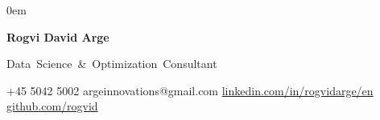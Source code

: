 \documentclass[11pt,a4paper]{article}
\begin{document}
\parindent0em
\begin{center}
{\Huge \textcolor{myblue}{\textbf{Rogvi David Arge}} }\\
\vspace{0.2cm}

{\Large \mbox{Data Science \& Optimization Consultant}}
\end{center}

\vspace{0.1cm}
\footnotesize
+45 5042 5002 \hspace{0.5cm} argeinnovations@gmail.com \hspace{0.5cm} \url{linkedin.com/in/rogvidarge/en} \hspace{0.5cm} \url{github.com/rogvid} \\

% 
% 
% 
% 
% 
\normalsize
\end{document}
